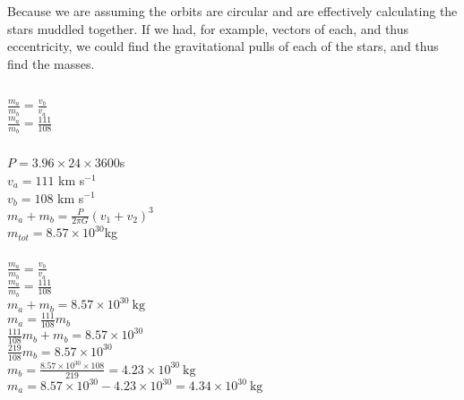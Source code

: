 \documentclass{article}
\begin{document}
\subsubsection{}
    \begin{center}
        Because we are assuming the orbits are circular and are effectively calculating the stars muddled together. If we had, for example, vectors of each, and thus eccentricity, we could find the gravitational pulls of each of the stars, and thus find the masses.
    \end{center}

\subsection{}
\subsubsection{}

\begin{center}
        \(\frac{m_a}{m_b} = \frac{v_b}{v_a}\)\\
        \(\frac{m_a}{m_b} = \frac{111}{108}\)
\end{center}

\subsubsection{}

\begin{center}
    \(P = 3.96 \times 24 \times 3600\)s \\
    \(v_a = 111 \) km s\(^{-1}\)\\
    \(v_b = 108 \) km s\(^{-1}\)\\
    \vspace{6mm}
    \(m_a + m_b = \frac{P}{2\pi G} (v_1 + v_2)^3 \)\\
    \(m_{tot} = 8.57 \times 10^{30}\)kg
\end{center}



\subsubsection{}
\begin{center}
    \(\frac{m_a}{m_b} = \frac{v_b}{v_a}\)\\
    \(\frac{m_a}{m_b} = \frac{111}{108}\)\\
    \(m_a + m_b = 8.57 \times 10^{30}\ \mathrm{kg}\)\\
    \(m_a = \frac{111}{108} m_b\)\\
    \(\frac{111}{108}m_b + m_b = 8.57 \times 10^{30}\)\\
    \(\frac{219}{108}m_b = 8.57 \times 10^{30}\)\\
    \(m_b = \frac{8.57 \times 10^{30} \times 108}{219} = 4.23 \times 10^{30}\ \mathrm{kg}\)\\
    \(m_a = 8.57 \times 10^{30} - 4.23 \times 10^{30} = 4.34 \times 10^{30}\ \mathrm{kg}\)
\end{center}
\end{document}
